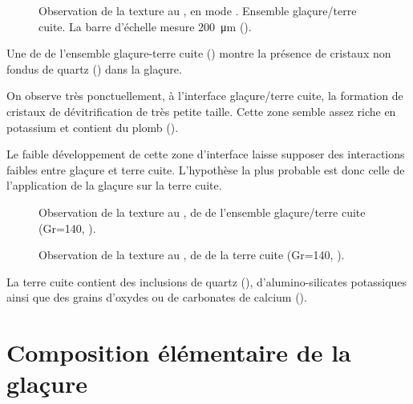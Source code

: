 \begin{figure}[htb]
  \caption[\ -- Observation de la texture au \MEB, 
           en mode \ERD. Ensemble glaçure/terre cuite]
          {\legendeD 
           Observation de la texture au \MEB, en mode \ERD. 
           Ensemble glaçure/terre cuite. La barre d'échelle mesure 
           \SI{200}{\um} ().}
  \label{MEB:6531_img}
\end{figure}

Une \carto de \RX de l'ensemble glaçure-terre cuite 
() montre la présence de cristaux non 
fondus de quartz (\quartz) dans la glaçure.

On observe très ponctuellement, à l'interface glaçure/terre cuite, la 
formation de cristaux de dévitrification de très petite taille. Cette 
zone semble assez riche en potassium et contient du plomb 
().

Le faible développement de cette zone d'interface laisse supposer des 
interactions faibles entre glaçure et terre cuite. L'hypothèse la plus 
probable est donc celle de l'application de la glaçure sur la terre 
cuite.

\begin{figure}[htb]
  \caption[\ -- Observation de la texture au \MEB, \carto de \RX de l'ensemble glaçure/terre cuite]
          {\legendeD 
           Observation de la texture au \MEB, \carto de \RX de l'ensemble glaçure/terre cuite (Gr=140, ).}
  \label{MEB:6531_carto_tcgla}
\end{figure}

\begin{figure}[htb]
  \caption[\ -- Observation de la texture au \MEB, \carto de \RX de la terre cuite]
          {\legendeD 
           Observation de la texture au \MEB, \carto de \RX de la terre cuite (Gr=140, ).}
  \label{MEB:6531_carto_tc}
\end{figure}

La terre cuite contient des inclusions de quartz (\quartz), 
d'alumino-silicates potassiques ainsi que des grains d'oxydes ou de 
carbonates de calcium ().


\section{Composition élémentaire de la glaçure}

